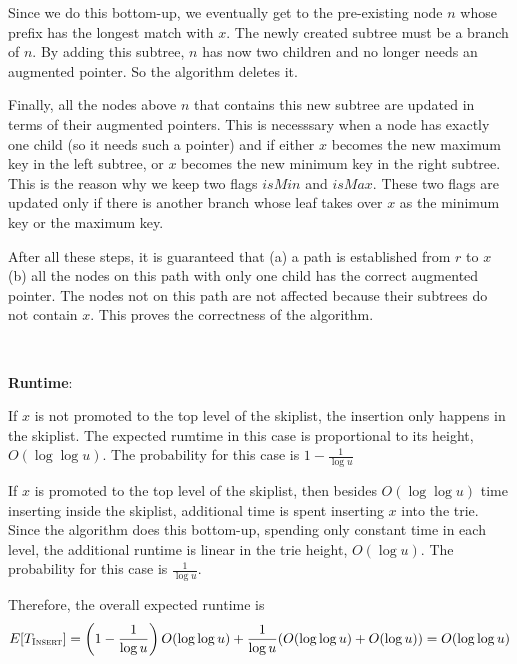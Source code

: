 \documentclass{article}
\begin{document}
Since we do this bottom-up, we eventually get to the pre-existing node $n$ whose prefix has the longest match with $x$. The newly created subtree must be a branch of $n$. By adding this subtree, $n$ has now two children and no longer needs an augmented pointer. So the algorithm deletes it.

Finally, all the nodes above $n$ that contains this new subtree are updated in terms of their augmented pointers. This is necesssary when a node has exactly one child (so it needs such a pointer) and if either $x$ becomes the new maximum key in the left subtree, or $x$ becomes the new minimum key in the right subtree. This is the reason why we keep two flags $isMin$ and $isMax$. These two flags are updated only if there is another branch whose leaf takes over $x$ as the minimum key or the maximum key.

After all these steps, it is guaranteed that (a) a path is established from $r$ to $x$ (b) all the nodes on this path with only one child has the correct augmented pointer. The nodes not on this path are not affected because their subtrees do not contain $x$. This proves the correctness of the algorithm.

~

\noindent\textbf{Runtime}:

If $x$ is not promoted to the top level of the skiplist, the insertion only happens in the skiplist. The expected rumtime in this case is proportional to its height, $O(\log\log u)$. The probability for this case is $1-\frac{1}{\log u}$

If $x$ is promoted to the top level of the skiplist, then besides $O(\log\log u)$ time inserting inside the skiplist, additional time is spent inserting $x$ into the trie. Since the algorithm does this bottom-up, spending only constant time in each level, the additional runtime is linear in the trie height, $O(\log u)$. The probability for this case is $\frac{1}{\log u}$.

Therefore, the overall expected runtime is
\begin{equation*}
E[T_{\textsc{Insert}}]=\left(1-\frac{1}{\log u}\right)O(\log\log u)+\frac{1}{\log u}(O(\log\log u)+O(\log u))=O(\log\log u)
\end{equation*}
\end{document}
